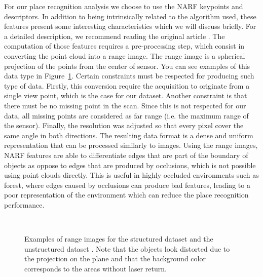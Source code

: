 For our place recognition analysis we choose to use the NARF keypoints and descriptors. In addition to being intrinsically related to the algorithm used, these features present some interesting characteristics which we will discuss briefly. For a detailed description, we recommend reading the original article \citet{Steder2011b}. The computation of those features requires a pre-processing step, which consist in converting the point cloud into a range image. The range image is a spherical projection of the points from the center of sensor. You can see examples of this data type in Figure~\ref{fig:chap_slam_range}. Certain constraints must be respected for producing such type of data. Firstly, this conversion require the acquisition to originate from a single view point, which is the case for our dataset. Another constraint is that there must be no missing point in the scan. Since this is not respected for our data, all missing points are considered as far range (i.e. the maximum range of the sensor). Finally, the resolution was adjusted so that every pixel cover the same angle in both directions. The resulting data format is a dense and uniform representation that can be processed similarly to images. Using the range images, NARF features are able to differentiate edges that are part of the boundary of objects as oppose to edges that are produced by occlusions, which is not possible using point clouds directly. This is useful in highly occluded environments such as forest, where edges caused by occlusions can produce bad features, leading to a poor representation of the environment which can reduce the place recognition performance.

\begin{figure}[H]
    \centering
    \\
    \caption{Examples of range images for the structured dataset \protect{} and the unstructured dataset \protect{}. Note that the objects look distorted due to the projection on the plane and that the background color corresponds to the areas without laser return.}
    \label{fig:chap_slam_range}
\end{figure}

